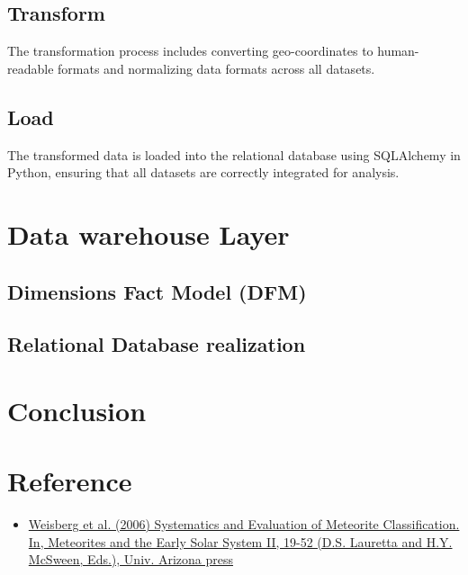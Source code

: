 \documentclass[conference]{IEEEtran}
\begin{document}
	
	\subsection{Transform}
	The transformation process includes converting geo-coordinates to human-readable formats and normalizing data formats across all datasets.
	
	\subsection{Load}
	The transformed data is loaded into the relational database using SQLAlchemy in Python, ensuring that all datasets are correctly integrated for analysis.
	
	\section{Data warehouse Layer}
	
	\subsection{Dimensions Fact Model (DFM)}
	
	\subsection{Relational Database realization}

	\section{Conclusion}
	
	\section{Reference}
	\begin{itemize}
		\item \href{https://web.pdx.edu/~ruzickaa/meteorites/papers/WeisbergEtal2006-classification.pdf}{Weisberg et al. (2006) Systematics and Evaluation of Meteorite Classification. In, Meteorites and the Early Solar System II, 19-52 (D.S. Lauretta and H.Y. McSween, Eds.), Univ. Arizona press}
		 
	\end{itemize}
	
	
	
	
	
\end{document}
